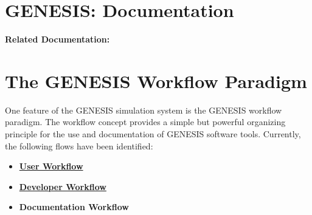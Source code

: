 \documentclass[12pt]{article}
\begin{document}
\section*{GENESIS: Documentation}

{\bf Related Documentation:}

\section*{The GENESIS Workflow Paradigm}

One feature of the GENESIS simulation system is the GENESIS workflow paradigm. The workflow concept provides a simple but powerful organizing principle for the use and documentation of GENESIS software tools. Currently, the following flows have been identified:

\begin{itemize}
\item \href {../workflow-user/workflow-user.tex}{\bf User Workflow}
\item \href{../workflow-developer/workflow-developer.tex}{\bf Developer Workflow}
\item {\bf Documentation Workflow}
\end{itemize}
\end{document}
